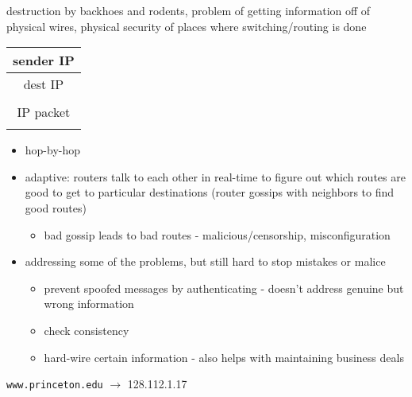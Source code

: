destruction by backhoes and rodents, problem
of getting information off of physical wires, physical security of places where
switching/routing is done
\begin{tabular}{|c|}
\hline
sender IP\\
\hline
dest IP\\
\hline
 \\
IP packet\\
 \\
\hline
\end{tabular}
\begin{itemize}
\item hop-by-hop
\item adaptive: routers talk to each other in real-time to figure out which
    routes are good to get to particular destinations (router gossips with
            neighbors to find good routes)
    \begin{itemize}
    \item bad gossip leads to bad routes - malicious/censorship, misconfiguration
    \end{itemize}
\item addressing some of the problems, but still hard to stop mistakes or malice
    \begin{itemize}
    \item prevent spoofed messages by authenticating - doesn't address genuine
        but wrong information
    \item check consistency
    \item hard-wire certain information - also helps with maintaining business
        deals
    \end{itemize}
\end{itemize}
\texttt{www.princeton.edu} $\rightarrow$ 128.112.1.17

